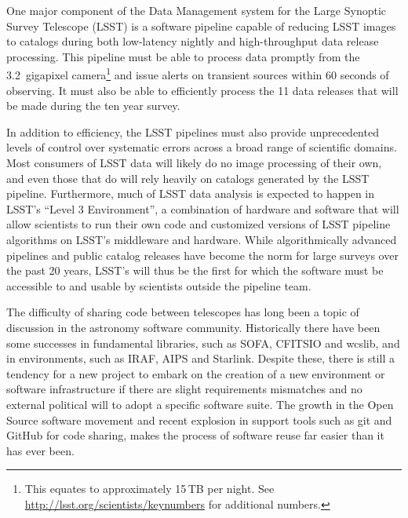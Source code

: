 \documentclass[]{spie}  %
\begin{document}
One major component of the Data Management system\cite{2016_adassxxv_O3-1} for the Large Synoptic Survey Telescope (LSST)\cite{2008arXiv0805.2366I,2016SPIE-Kahn,2014SPIE.9145E..1AG} is a software pipeline capable of reducing LSST images to catalogs during both low-latency nightly and high-throughput data release processing.
This pipeline must be able to process data promptly from the 3.2~gigapixel camera\footnote{This equates to approximately 15\,TB per night. See \url{http://lsst.org/scientists/keynumbers} for additional numbers.} and issue alerts on transient sources within 60 seconds of observing\cite{2014htu..conf...19K}.
It must also be able to efficiently process the 11 data releases that will be made during the ten year survey.

In addition to efficiency, the LSST pipelines must also provide unprecedented levels of control over systematic errors across a broad range of scientific domains.
Most consumers of LSST data will likely do no image processing of their own, and even those that do will rely heavily on catalogs generated by the LSST pipeline.
Furthermore, much of LSST data analysis is expected to happen in LSST's ``Level 3 Environment'', a combination of hardware and software that will allow scientists to run their own code and customized versions of LSST pipeline algorithms on LSST's middleware and hardware.
While algorithmically advanced pipelines and public catalog releases have become the norm for large surveys over the past 20 years, LSST's will thus be the first for which the software must be accessible to and usable by scientists outside the pipeline team.

The difficulty of sharing code between telescopes has long been a topic of discussion in the astronomy software community\cite{1998ASPC..145..142M,1999ASPC..172...11E,2001ASSL..266..163S,2002SPIE.4844..321E}.
Historically there have been some successes in fundamental libraries, such as SOFA\cite{2011SchpJ...611404H}, CFITSIO\cite{1999ASPC..172..487P} and wcslib\cite{2011ascl.soft08003C}, and in environments, such as IRAF\cite{1986SPIE..627..733T}, AIPS\cite{1996ASPC..101...37V} and Starlink\cite{1982QJRAS..23..485D}.
Despite these, there is still a tendency for a new project to embark on the creation of a new environment or software infrastructure if there are slight requirements mismatches and no external political will to adopt a specific software suite.
The growth in the Open Source software movement\cite{2006OpenSources} and recent explosion in support tools such as git and GitHub for code sharing\cite{2014IACWSLima}, makes the process of software reuse far easier than it has ever been.
\end{document}

